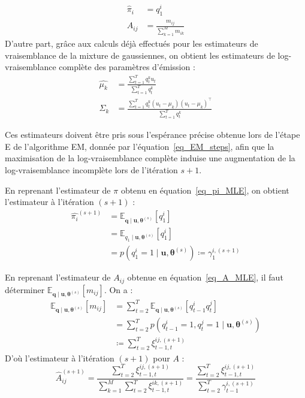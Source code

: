 \documentclass[12pt,a4paper,onecolumn]{article}
\begin{document}
\begin{align}
	\widehat{\pi}_{i} & = q_1^i                              \label{eq_pi_MLE}  \\
	\widehat{A}_{ij}  & = \frac{m_{ij}}{\sum_{k = 1}^M m_{ik}} \label{eq_A_MLE}
\end{align}
D'autre part, grâce aux calculs déjà effectués pour les estimateurs de vraisemblance de la mixture de gaussiennes, on obtient les estimateurs de log-vraisemblance complète des paramètres d'émission :
\begin{align}
	\widehat{\mu_k}    & = \frac{\sum_{t = 1}^T q_{t}^k u_t}{\sum_{t = 1}^T q_{t}^k}                                                     \\
	\widehat{\Sigma_k} & = \frac{\sum_{t = 1}^T q_t^k\left(u_t - \mu_k\right)\left(u_t - \mu_k\right)^{\intercal}}{\sum_{t = 1}^T q_t^k}
\end{align}

Ces estimateurs doivent être pris sous l'espérance précise obtenue lors de l'étape E de l'algorithme EM, donnée par l'équation~\eqref{eq_EM_steps}, afin que la maximisation de la log-vraisemblance complète induise une augmentation de la log-vraisemblance incomplète lors de l'itération \(s + 1\).

En reprenant l'estimateur de \(\pi\) obtenu en équation~\eqref{eq_pi_MLE}, on obtient l'estimateur à l'itération \((s + 1)\) :
\begin{equation}
	\begin{split}
		\widehat{\pi_{i}}^{(s + 1)} &= \mathbb{E}_{\bm{q} \mid \bm{u}, \bm{\theta}^{(s)}}[q_1^i] \\
		&= \mathbb{E}_{q_1 \mid \bm{u}, \bm{\theta}^{(s)}}[q_1^i] \\
		&= p(q_1^i = 1 \mid \bm{u}, \bm{\theta}^{(s)}) \coloneqq \gamma_1^{i, (s+1)}
	\end{split}
\end{equation}

En reprenant l'estimateur de \(A_{ij}\) obtenue en équation~\eqref{eq_A_MLE}, il faut déterminer \(\mathbb{E}_{\bm{q} \mid \bm{u}, \bm{\theta}^{(s)}}[m_{ij}]\). On a :
\begin{equation*}
	\begin{split}
		\mathbb{E}_{\bm{q} \mid \bm{u}, \bm{\theta}^{(s)}}[m_{ij}] &= \sum_{t=2}^T \mathbb{E}_{\bm{q} \mid \bm{u}, \bm{\theta}^{(s)}}\left[q_{t-1}^i q_t^j\right]\\
		&= \sum_{t=2}^T p\left(q_{t-1}^i = 1, q_t^j = 1 \mid \bm{u}, \bm{\theta}^{(s)}\right)\\
		&\coloneqq \sum_{t=2}^T \xi^{ij, (s+1)}_{t-1, t}
	\end{split}
\end{equation*}
D'où l'estimateur à l'itération \((s+1)\) pour \(A\) :
\begin{equation}
	\widehat{A}_{ij}^{(s+1)} = \frac{\sum_{t=2}^T \xi^{ij, (s+1)}_{t-1, t}}{\sum_{k = 1}^M\sum_{t=2}^T \xi^{ik, (s+1)}_{t-1, t}} = \frac{\sum_{t=2}^T \xi^{ij, (s+1)}_{t-1, t}}{\sum_{t=2}^T \gamma^{i, (s+1)}_{t-1}}
\end{equation}
\end{document}
